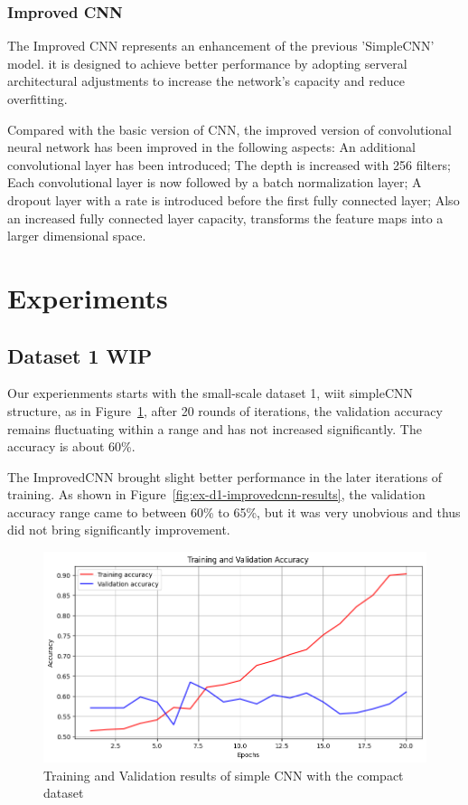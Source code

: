 \documentclass[final]{cvpr}
\begin{document}
\subsubsection{Improved CNN}

The Improved CNN represents an enhancement of the previous 'SimpleCNN' model. it is designed to achieve better performance by adopting serveral architectural adjustments to increase the network's capacity and reduce overfitting.

Compared with the basic version of CNN, the improved version of convolutional neural network has been improved in the following aspects: An additional convolutional layer has been introduced; The depth is increased with 256 filters; Each convolutional layer is now followed by a batch normalization layer; A dropout layer with a rate is introduced before the first fully connected layer; Also an increased fully connected layer capacity, transforms the feature maps into a larger dimensional space.


\section{Experiments}

\subsection{Dataset 1 WIP}

Our experienments starts with the small-scale dataset 1, wiit simpleCNN structure, as in Figure~\ref*{fig:ex-d1-simplecnn-results}, after 20 rounds of iterations, the validation accuracy remains fluctuating within a range and has not increased significantly. The accuracy is about 60\%.

The ImprovedCNN brought slight better performance in the later iterations of training. As shown in Figure~\ref*{fig:ex-d1-improvedcnn-results}, the validation accuracy range came to between 60\% to 65\%, but it was very unobvious and thus did not bring significantly improvement.

\begin{figure}[t]
   \centering
   \includegraphics[width=0.9\linewidth]{img/ex-d1-simplecnn-accuracy-results.png}
   \caption{Training and Validation results of simple CNN with the compact dataset}
   \label{fig:ex-d1-simplecnn-results}
\end{figure}
\end{document}
